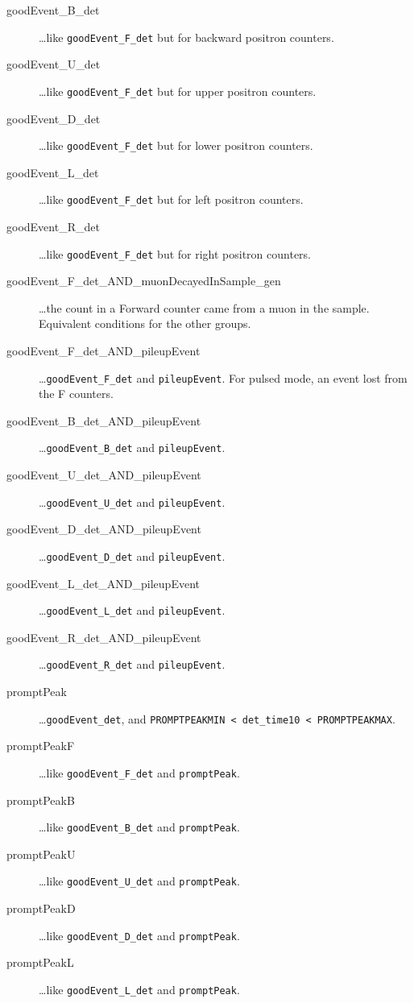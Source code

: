 \documentclass[twoside]{dis04}
\begin{document}
\begin{description}
\begin{description}
	\item[goodEvent\_B\_det]         \ldots  like {\tt goodEvent\_F\_det} but for backward positron counters.
	\item[goodEvent\_U\_det]         \ldots  like {\tt goodEvent\_F\_det} but for upper    positron counters.
	\item[goodEvent\_D\_det]         \ldots  like {\tt goodEvent\_F\_det} but for lower    positron counters.
	\item[goodEvent\_L\_det]         \ldots  like {\tt goodEvent\_F\_det} but for left     positron counters.
	\item[goodEvent\_R\_det]         \ldots  like {\tt goodEvent\_F\_det} but for right    positron counters.
	\item[goodEvent\_F\_det\_AND\_muonDecayedInSample\_gen] \ldots the count in a Forward counter came from a muon in the sample. Equivalent conditions for the other groups.
	\item[goodEvent\_F\_det\_AND\_pileupEvent] \ldots {\tt goodEvent\_F\_det} and {\tt pileupEvent}. For pulsed mode, an event lost from the F counters.
	\item[goodEvent\_B\_det\_AND\_pileupEvent] \ldots {\tt goodEvent\_B\_det} and {\tt pileupEvent}.
	\item[goodEvent\_U\_det\_AND\_pileupEvent] \ldots {\tt goodEvent\_U\_det} and {\tt pileupEvent}.
	\item[goodEvent\_D\_det\_AND\_pileupEvent] \ldots {\tt goodEvent\_D\_det} and {\tt pileupEvent}.
	\item[goodEvent\_L\_det\_AND\_pileupEvent] \ldots {\tt goodEvent\_L\_det} and {\tt pileupEvent}.
	\item[goodEvent\_R\_det\_AND\_pileupEvent] \ldots {\tt goodEvent\_R\_det} and {\tt pileupEvent}.
	\item[promptPeak]                 \ldots  {\tt goodEvent\_det}, and {\tt PROMPTPEAKMIN < det\_time10 < PROMPTPEAKMAX}.
	\item[promptPeakF]                \ldots  like {\tt goodEvent\_F\_det} and {\tt promptPeak}.
	\item[promptPeakB]                \ldots  like {\tt goodEvent\_B\_det} and {\tt promptPeak}.
	\item[promptPeakU]                \ldots  like {\tt goodEvent\_U\_det} and {\tt promptPeak}.
	\item[promptPeakD]                \ldots  like {\tt goodEvent\_D\_det} and {\tt promptPeak}.
	\item[promptPeakL]                \ldots  like {\tt goodEvent\_L\_det} and {\tt promptPeak}.

\end{description}
\end{description}
\end{document}
